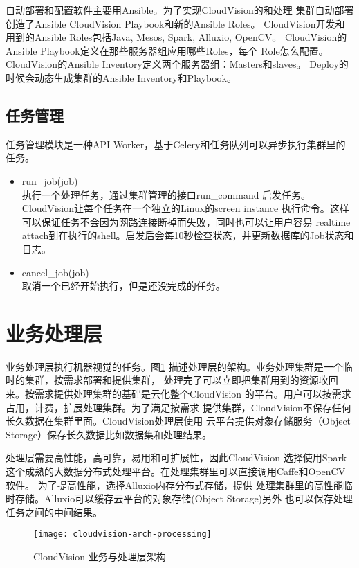 自动部署和配置软件主要用Ansible。为了实现CloudVision的和处理
集群自动部署创造了Ansible CloudVision Playbook和新的Ansible Roles。
CloudVision开发和用到的Ansible Roles包括Java, Mesos, Spark, Alluxio, OpenCV。
CloudVision的Ansible Playbook定义在那些服务器组应用哪些Roles，每个
Role怎么配置。CloudVision的Ansible Inventory定义两个服务器组：Masters和slaves。
Deploy的时候会动态生成集群的Ansible Inventory和Playbook。

\subsection{任务管理}
任务管理模块是一种API Worker，基于Celery和任务队列可以异步执行集群里的任务。
\begin{itemize}
  \item run\_job(job) \\
        执行一个处理任务，通过集群管理的接口run\_command
        启发任务。CloudVision让每个任务在一个独立的Linux的screen instance
        执行命令。这样可以保证任务不会因为网路连接断掉而失败，同时也可以让用户容易
        realtime attach到在执行的shell。启发后会每10秒检查状态，并更新数据库的Job状态和日志。
  \item cancel\_job(job) \\
        取消一个已经开始执行，但是还没完成的任务。
\end{itemize}

\section{业务处理层}
\label{sec:arch_processing}
业务处理层执行机器视觉的任务。图\ref{fig:cloudvision-arch-processing}
描述处理层的架构。业务处理集群是一个临时的集群，按需求部署和提供集群，
处理完了可以立即把集群用到的资源收回来。按需求提供处理集群的基础是云化整个CloudVision
的平台。\cite{nistcloud}用户可以按需求占用，计费，扩展处理集群。为了满足按需求
提供集群，CloudVision不保存任何长久数据在集群里面。CloudVision处理层使用
云平台提供对象存储服务（Object Storage）保存长久数据比如数据集和处理结果。

处理层需要高性能，高可靠，易用和可扩展性，因此CloudVision
选择使用Spark这个成熟的大数据分布式处理平台。在处理集群里可以直接调用Caffe和OpenCV软件。
为了提高性能，选择Alluxio内存分布式存储，提供
处理集群里的高性能临时存储。Alluxio可以缓存云平台的对象存储(Object Storage)另外
也可以保存处理任务之间的中间结果。
\begin{figure}[h]
  \centering
    \texttt{[image: cloudvision-arch-processing]}
  \caption{CloudVision 业务与处理层架构}
  \label{fig:cloudvision-arch-processing}
\end{figure}

